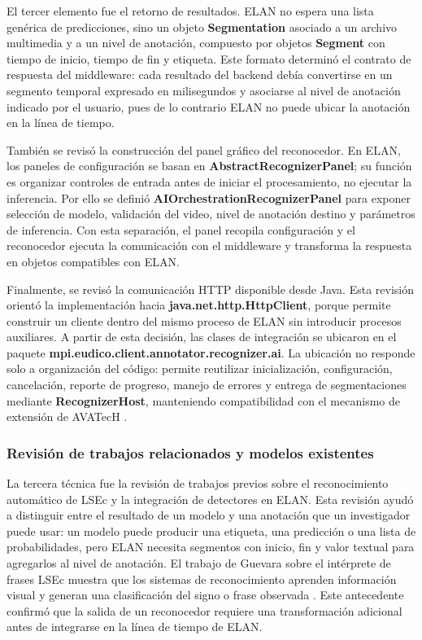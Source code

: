 \documentclass[11pt,a4paper]{article}
\begin{document}
El tercer elemento fue el retorno de resultados. ELAN no espera una lista genérica de predicciones, sino un objeto \textbf{Segmentation} asociado a un archivo multimedia y a un nivel de anotación, compuesto por objetos \textbf{Segment} con tiempo de inicio, tiempo de fin y etiqueta. Este formato determinó el contrato de respuesta del middleware: cada resultado del backend debía convertirse en un segmento temporal expresado en milisegundos y asociarse al nivel de anotación indicado por el usuario, pues de lo contrario ELAN no puede ubicar la anotación en la línea de tiempo.

También se revisó la construcción del panel gráfico del reconocedor. En ELAN, los paneles de configuración se basan en \textbf{AbstractRecognizerPanel}; su función es organizar controles de entrada antes de iniciar el procesamiento, no ejecutar la inferencia. Por ello se definió \textbf{AIOrchestrationRecognizerPanel} para exponer selección de modelo, validación del video, nivel de anotación destino y parámetros de inferencia. Con esta separación, el panel recopila configuración y el reconocedor ejecuta la comunicación con el middleware y transforma la respuesta en objetos compatibles con ELAN.

Finalmente, se revisó la comunicación HTTP disponible desde Java. Esta revisión orientó la implementación hacia \textbf{java.net.http.HttpClient}, porque permite construir un cliente dentro del mismo proceso de ELAN sin introducir procesos auxiliares. A partir de esta decisión, las clases de integración se ubicaron en el paquete \textbf{mpi.eudico.client.annotator.recognizer.ai}. La ubicación no responde solo a organización del código: permite reutilizar inicialización, configuración, cancelación, reporte de progreso, manejo de errores y entrega de segmentaciones mediante \textbf{RecognizerHost}, manteniendo compatibilidad con el mecanismo de extensión de AVATecH \cite{auer2014avatech}.

\subsubsection{Revisión de trabajos relacionados y modelos existentes}

La tercera técnica fue la revisión de trabajos previos sobre el reconocimiento automático de LSEc y la integración de detectores en ELAN. Esta revisión ayudó a distinguir entre el resultado de un modelo y una anotación que un investigador puede usar: un modelo puede producir una etiqueta, una predicción o una lista de probabilidades, pero ELAN necesita segmentos con inicio, fin y valor textual para agregarlos al nivel de anotación. El trabajo de Guevara sobre el intérprete de frases LSEc muestra que los sistemas de reconocimiento aprenden información visual y generan una clasificación del signo o frase observada \cite{guevara2022lsec_interprete}. Este antecedente confirmó que la salida de un reconocedor requiere una transformación adicional antes de integrarse en la línea de tiempo de ELAN.
\end{document}
